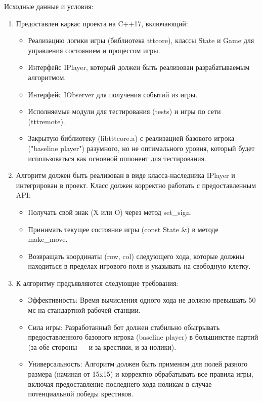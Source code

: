 \documentclass[a4paper]{article}
\begin{document}
Исходные данные и условия:
\begin{enumerate}
	\item Предоставлен каркас проекта на C++17, включающий:
	\begin{itemize}
		\item Реализацию логики игры (библиотека tttcore), классы State и Game для управления состоянием и процессом игры.
		\item Интерфейс IPlayer, который должен быть реализован разрабатываемым алгоритмом.
		\item Интерфейс IObserver для получения событий из игры.
		\item Исполняемые модули для тестирования (tests) и игры по сети (tttremote).
		\item Закрытую библиотеку (libtttcore.a) с реализацией базового игрока ("baseline player") разумного, но не оптимального уровня, который будет использоваться как основной оппонент для тестирования.
		 
	\end{itemize}
	\item Алгоритм должен быть реализован в виде класса-наследника IPlayer и интегрирован в проект. Класс должен корректно работать с предоставленным API:
	\begin{itemize}
		\item Получать свой знак (X или O) через метод set\_sign.
		\item Принимать текущее состояние игры (const State \&) в методе make\_move.
		\item Возвращать координаты (row, col) следующего хода, которые должны находиться в пределах игрового поля и указывать на свободную клетку.
	\end{itemize}
	\item К алгоритму предъявляются следующие требования:
	\begin{itemize}
		\item Эффективность: Время вычисления одного хода не должно превышать 50 мс на стандартной рабочей станции.
		\item Сила игры: Разработанный бот должен стабильно обыгрывать предоставленного базового игрока (baseline player) в большинстве партий (за обе стороны — и за крестики, и за нолики).
		\item Универсальность: Алгоритм должен быть применим для полей разного размера (начиная от 15x15) и корректно обрабатывать все правила игры, включая предоставление последнего хода ноликам в случае потенциальной победы крестиков.
		

\end{itemize}
\end{enumerate}
\end{document}
